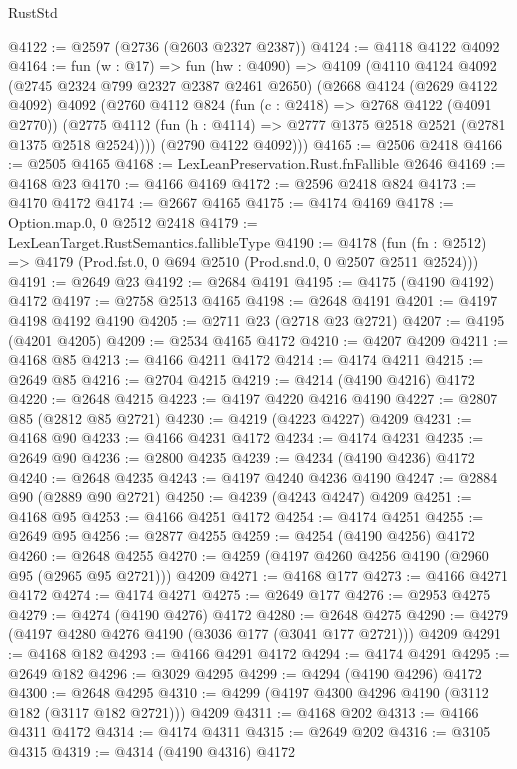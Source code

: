 \begin{lexlean}{RustStd}
\begin{coremodule}
@4122 := @2597 (@2736 (@2603 @2327 @2387))
@4124 := @4118 @4122 @4092
@4164 := fun (w : @17) =>
  fun (hw : @4090) =>
  @4109
    (@4110
      @4124
      @4092
      (@2745 @2324 @799 @2327 @2387 @2461 @2650)
      (@2668
        @4124
        (@2629 @4122 @4092)
        @4092
        (@2760
          @4112
          @824
          (fun (c : @2418) => @2768 @4122 (@4091 @2770))
          (@2775 @4112 (fun (h : @4114) => @2777 @1375 @2518 @2521 (@2781 @1375 @2518 @2524))))
        (@2790 @4122 @4092)))
@4165 := @2506 @2418
@4166 := @2505 @4165
@4168 := LexLeanPreservation.Rust.fnFallible @2646
@4169 := @4168 @23
@4170 := @4166 @4169
@4172 := @2596 @2418 @824
@4173 := @4170 @4172
@4174 := @2667 @4165
@4175 := @4174 @4169
@4178 := Option.map.{0, 0} @2512 @2418
@4179 := LexLeanTarget.RustSemantics.fallibleType
@4190 := @4178
    (fun (fn : @2512) => @4179 (Prod.fst.{0, 0} @694 @2510 (Prod.snd.{0, 0} @2507 @2511 @2524)))
@4191 := @2649 @23
@4192 := @2684 @4191
@4195 := @4175 (@4190 @4192) @4172
@4197 := @2758 @2513 @4165
@4198 := @2648 @4191
@4201 := @4197 @4198 @4192 @4190
@4205 := @2711 @23 (@2718 @23 @2721)
@4207 := @4195 (@4201 @4205)
@4209 := @2534 @4165 @4172
@4210 := @4207 @4209
@4211 := @4168 @85
@4213 := @4166 @4211 @4172
@4214 := @4174 @4211
@4215 := @2649 @85
@4216 := @2704 @4215
@4219 := @4214 (@4190 @4216) @4172
@4220 := @2648 @4215
@4223 := @4197 @4220 @4216 @4190
@4227 := @2807 @85 (@2812 @85 @2721)
@4230 := @4219 (@4223 @4227) @4209
@4231 := @4168 @90
@4233 := @4166 @4231 @4172
@4234 := @4174 @4231
@4235 := @2649 @90
@4236 := @2800 @4235
@4239 := @4234 (@4190 @4236) @4172
@4240 := @2648 @4235
@4243 := @4197 @4240 @4236 @4190
@4247 := @2884 @90 (@2889 @90 @2721)
@4250 := @4239 (@4243 @4247) @4209
@4251 := @4168 @95
@4253 := @4166 @4251 @4172
@4254 := @4174 @4251
@4255 := @2649 @95
@4256 := @2877 @4255
@4259 := @4254 (@4190 @4256) @4172
@4260 := @2648 @4255
@4270 := @4259 (@4197 @4260 @4256 @4190 (@2960 @95 (@2965 @95 @2721))) @4209
@4271 := @4168 @177
@4273 := @4166 @4271 @4172
@4274 := @4174 @4271
@4275 := @2649 @177
@4276 := @2953 @4275
@4279 := @4274 (@4190 @4276) @4172
@4280 := @2648 @4275
@4290 := @4279 (@4197 @4280 @4276 @4190 (@3036 @177 (@3041 @177 @2721))) @4209
@4291 := @4168 @182
@4293 := @4166 @4291 @4172
@4294 := @4174 @4291
@4295 := @2649 @182
@4296 := @3029 @4295
@4299 := @4294 (@4190 @4296) @4172
@4300 := @2648 @4295
@4310 := @4299 (@4197 @4300 @4296 @4190 (@3112 @182 (@3117 @182 @2721))) @4209
@4311 := @4168 @202
@4313 := @4166 @4311 @4172
@4314 := @4174 @4311
@4315 := @2649 @202
@4316 := @3105 @4315
@4319 := @4314 (@4190 @4316) @4172

\end{coremodule}
\end{lexlean}

